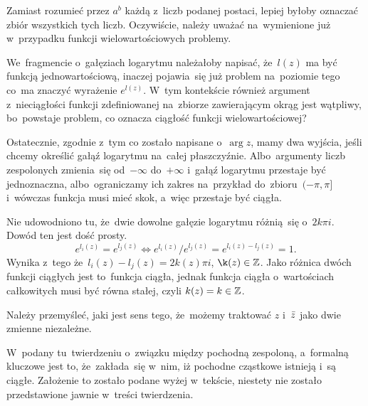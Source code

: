\documentclass[a4paper,11pt]{article}
\begin{document}
\vspace{\spaceFour}


\start {} Zamiast rozumieć przez $a^{ b }$ każdą z~liczb podanej
postaci, lepiej byłoby oznaczać zbiór wszystkich tych liczb.
Oczywiście, należy uważać na~wymienione już w~przypadku funkcji
wielowartościowych problemy.

\vspace{\spaceFour}


\start {} We~fragmencie o~gałęziach logarytmu należałoby
napisać, że~$l( z )$ ma być funkcją jednowartościową, inaczej
pojawia~się już problem na~poziomie tego co~ma znaczyć wyrażenie
$e^{ l( z ) }$. W~tym kontekście również argument z~nieciągłości
funkcji zdefiniowanej na~zbiorze zawierającym okrąg jest wątpliwy,
bo~powstaje problem, co oznacza ciągłość funkcji wielowartościowej?

Ostatecznie, zgodnie z~tym co zostało napisane o~$\arg z$, mamy dwa
wyjścia, jeśli chcemy określić gałąź logarytmu na~całej płaszczyźnie.
Albo~argumenty liczb zespolonych zmienia~się od~$-\infty$ do~$+\infty$
i~gałąź logarytmu przestaje być jednoznaczna, albo~ograniczamy ich
zakres na~przykład do~zbioru~$( -\pi, \pi ]$ i~wówczas funkcja musi
mieć skok, a~więc przestaje być ciągła.

\vspace{\spaceFour}


\start {} Nie udowodniono tu, że~dwie dowolne gałęzie logarytmu
różnią~się o~$2 k \pi i$. Dowód ten jest dość prosty.
\begin{equation}
  \label{eq:Leja-36}
  e^{ l_{ i }( z ) } = e^{ l_{ j }( z ) }
  \iff e^{ l_{ i }( z ) } / e^{ l_{ j }( z ) } = e^{ l_{ i }( z ) - l_{ j }( z ) }
  = 1.
\end{equation}
Wynika z~tego że~$l_{ i }( z ) - l_{ j }( z ) = 2 k( z ) \pi i$,
$\k( z ) \in \Z$. Jako różnica dwóch funkcji ciągłych jest to~funkcja
ciągła, jednak funkcja ciągła o~wartościach całkowitych musi być równa
stałej, czyli $k( z ) = k \in \mathbb{Z}$.

\vspace{\spaceFour}


\start {} Należy przemyśleć, jaki jest sens tego, że~możemy
traktować $z$ i~$\bar{ z }$ jako dwie zmienne niezależne.

\vspace{\spaceFour}


\start {} W~podany tu~twierdzeniu o~związku między pochodną
zespoloną, a~formalną kluczowe jest to, że~zakłada~się w~nim, iż
pochodne cząstkowe istnieją i~są ciągłe. Założenie to zostało podane
wyżej w~tekście, niestety nie zostało przedstawione jawnie w~treści
twierdzenia.
\end{document}
